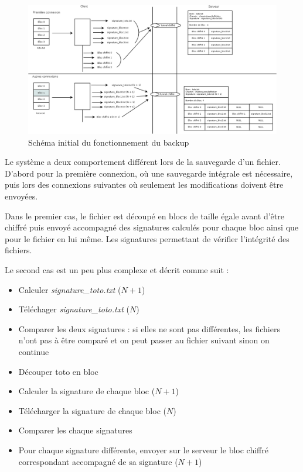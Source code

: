 \documentclass[a4paper,10pt, twoside]{report}
\begin{document}
\begin{spacing}{1.2}
\begin{figure}[h!]
    \hspace{-4.5em}
    \includegraphics[width=19cm]{algo/schemaInitial.png}
    \caption{\label{schemaInitial} Sch\'ema initial du fonctionnement du backup}
\end{figure}

Le syst\`eme a deux comportement diff\'erent lors de la sauvegarde d'un fichier.
D'abord pour la premi\`ere connexion, o\`u une sauvegarde int\'egrale est
n\'ecessaire, puis lors des connexions suivantes o\`u seulement les
modifications doivent \^etre envoy\'ees.

Dans le premier cas, le fichier est d\'ecoup\'e en blocs de taille \'egale
avant d'\^etre chiffr\'e puis envoy\'e accompagn\'e des signatures calcul\'es
pour chaque bloc ainsi que pour le fichier en lui m\^eme. Les signatures
permettant de v\'erifier l'int\'egrit\'e des fichiers.

Le second cas est un peu plus complexe et d\'ecrit comme suit :
\begin{itemize}
 \item Calculer \textit{signature\_toto.txt} (\(N + 1\))
 \item T\'el\'echager \textit{signature\_toto.txt} (\(N\))
 \item Comparer les deux signatures : si elles ne sont pas diff\'erentes, les
 fichiers n'ont pas \`a \^etre compar\'e et on peut passer au fichier suivant
 sinon on continue
 \item D\'ecouper toto en bloc
 \item Calculer la signature de chaque bloc (\(N + 1\))
 \item T\'el\'echarger la signature de chaque bloc (\(N\))
 \item Comparer les chaque signatures
 \item Pour chaque signature diff\'erente, envoyer sur le serveur le bloc
 chiffr\'e correspondant accompagn\'e de sa signature (\(N + 1\))
\end{itemize}


\end{spacing}
\end{document}
